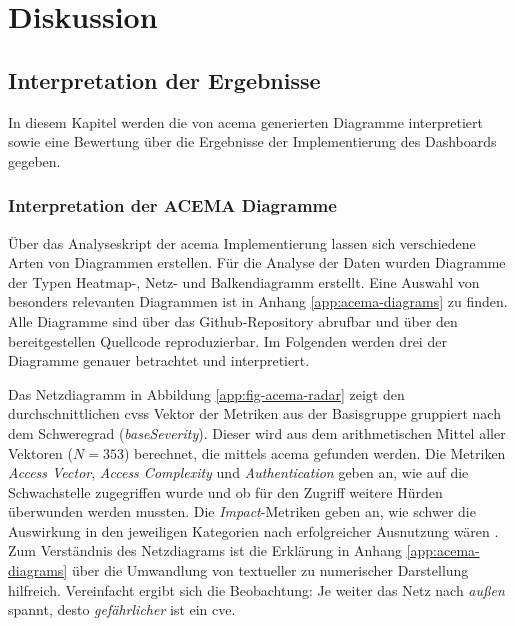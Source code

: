 \chapter{Diskussion}
\label{chap:diskussion}
\section{Interpretation der Ergebnisse}
\label{sec:interpretation}
In diesem Kapitel werden die von \gls{acema} generierten Diagramme interpretiert sowie eine Bewertung über die Ergebnisse der Implementierung des Dashboards gegeben.
\subsection{Interpretation der ACEMA Diagramme}
\label{sec:interpretation-acema}
Über das Analyseskript der \gls{acema} Implementierung lassen sich verschiedene Arten von Diagrammen erstellen. Für die Analyse der Daten wurden Diagramme der Typen Heatmap-, Netz- und Balkendiagramm erstellt. Eine Auswahl von besonders relevanten Diagrammen ist in Anhang \ref{app:acema-diagrams} zu finden. Alle Diagramme sind über das Github-Repository \autocite{jesseDumpeldownAcema_oranDev} abrufbar und über den bereitgestellen Quellcode reproduzierbar. Im Folgenden werden drei der Diagramme genauer betrachtet und interpretiert.
\par Das Netzdiagramm in Abbildung \ref{app:fig-acema-radar} zeigt den durchschnittlichen \gls{cvss} Vektor der Metriken aus der Basisgruppe gruppiert nach dem Schweregrad (\textit{baseSeverity}). Dieser wird aus dem arithmetischen Mittel aller Vektoren (\(N = 353\)) berechnet, die mittels \gls{acema} gefunden werden. Die Metriken \textit{Access Vector}, \textit{Access Complexity} und \textit{Authentication} geben an, wie auf die Schwachstelle zugegriffen wurde und ob für den Zugriff weitere Hürden überwunden werden mussten. Die \textit{Impact}-Metriken geben an, wie schwer die Auswirkung in den jeweiligen Kategorien nach erfolgreicher Ausnutzung wären \autocite{CVSSV2Complete}. Zum Verständnis des Netzdiagrams ist die Erklärung in Anhang \ref{app:acema-diagrams} über die Umwandlung von textueller zu numerischer Darstellung hilfreich. Vereinfacht ergibt sich die Beobachtung: Je weiter das Netz nach \textit{außen} spannt, desto \textit{gefährlicher} ist ein \gls{cve}.
